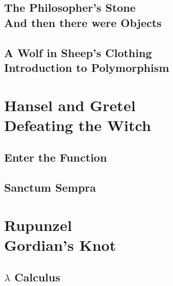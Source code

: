 \documentclass[oneside,12pt]{memoir} %
\begin{document}
\section{\textbf{The Philosopher's Stone}\\
And then there were Objects}
\label{object_oriented_programming_introduction}
\section{\textbf{A Wolf in Sheep's Clothing}\\
 Introduction to Polymorphism}
 \label{polymorphism}


\chapter{Hansel and Gretel \\
\large Defeating the Witch}
\section{\textbf{Enter the Function}}
\label{functions_introduction}
\section{\textbf{Sanctum Sempra}}
\label{funcitons_methods}



\chapter{Rupunzel \\
\large Gordian's Knot}

\section{\textbf{\ensuremath{\lambda} Calculus}}
\label{lambda_calculus}

\end{document}
